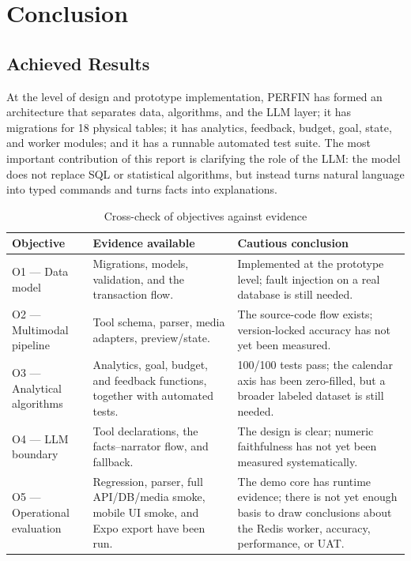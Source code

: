 \chapter{Conclusion}
\label{chap:conclusion}

\section{Achieved Results}

At the level of design and prototype implementation, PERFIN has formed an architecture that separates data, algorithms, and the LLM layer; it has migrations for 18 physical tables; it has analytics, feedback, budget, goal, state, and worker modules; and it has a runnable automated test suite. The most important contribution of this report is clarifying the role of the LLM: the model does not replace SQL or statistical algorithms, but instead turns natural language into typed commands and turns facts into explanations.

\begin{table}[H]
  \centering
  \caption{Cross-check of objectives against evidence}
  \label{tab:objective-evidence}
  \begin{tabularx}{\textwidth}{@{}L{3.6cm}Y Y@{}}
    \toprule
    \textbf{Objective} & \textbf{Evidence available} & \textbf{Cautious conclusion} \\
    \midrule
    O1 --- Data model & Migrations, models, validation, and the transaction flow. & Implemented at the prototype level; fault injection on a real database is still needed. \\
    O2 --- Multimodal pipeline & Tool schema, parser, media adapters, preview/state. & The source-code flow exists; version-locked accuracy has not yet been measured. \\
    O3 --- Analytical algorithms & Analytics, goal, budget, and feedback functions, together with automated tests. & 100/100 tests pass; the calendar axis has been zero-filled, but a broader labeled dataset is still needed. \\
    O4 --- LLM boundary & Tool declarations, the facts--narrator flow, and fallback. & The design is clear; numeric faithfulness has not yet been measured systematically. \\
    O5 --- Operational evaluation & Regression, parser, full API/DB/media smoke, mobile UI smoke, and Expo export have been run. & The demo core has runtime evidence; there is not yet enough basis to draw conclusions about the Redis worker, accuracy, performance, or UAT. \\
    \bottomrule
  \end{tabularx}
\end{table}


